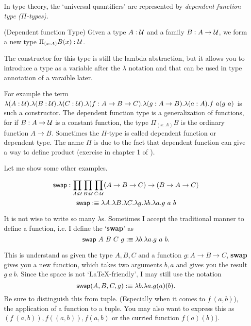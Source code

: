 In type theory, the `universal quantifiers' are represented by {\it
dependent function type ($\Pi$-types)}.

\begin{definition}
    \label{dependent-function}
    (Dependent function Type) Given a type $A:\mathcal{U}$ and a family 
    $B:A\to\mathcal{U}$, we form a new type $\Pi_{(x:A)}B(x): \mathcal{U}$.

    The constructor for this type is still the lambda abstraction,
    but it allows you to introduce a type as a variable after the $\lambda$
    notation and that can be used in type annotation of a varaible later.

\end{definition}

For example the term $\lambda (A:\mathcal{U}).\lambda (B:\mathcal{U}).\lambda (C:\mathcal{U}).\lambda (f: A\to B\to C).
\lambda (g: A\to B).\lambda (a: A). f\ a (g\ a)$ is such a constructor.
The dependent function type is a generalization of functions, for if
$B:A\to\mathcal{U}$ is a constant function, the type $\Pi_{(x:A)}B$ is
the ordinary function $A\to B$. Sometimes the $\Pi$-type is called 
dependent function or dependent type. The name $\Pi$ is due to the fact
that dependent function can give a way to define product (exercise in
chapter 1 of \cite{homotopy-type-theory}).

Let me show some other examples.

\newcommand{\swap}{\name{swap}}

$$
    \swap: \prod_{A:\universe}\prod_{B:\universe}\prod_{C:\universe}
    (A\to B\to C)\to (B\to A\to C)
$$
$$
    \swap \defn \lambda A.\lambda B.\lambda C.\lambda g.
    \lambda b.\lambda a. g\ a\ b
$$

It is not wise to write so many $\lambda$s. Sometimes I accept the
traditional manner to define a function, i.e. I define the `{\bf swap}' as
$$
    \swap\ A\ B\ C\ g \defn \lambda b.\lambda a.g\ a\ b.
$$

This is understand as given the type $A,B,C$ and a function $g:A\to B\to C$,
{\bf swap} gives you a new function, which takes two arguments $b,a$ and gives
you the result $g\ a\ b$. Since the space is not `\LaTeX-friendly', I may still
use the notation 
$$
\swap(A,B,C,g)\defn \lambda b.\lambda a.g(a)(b).
$$
Be sure to distinguish this from tuple. (Especially when it comes to $f\ (a, b)$),
the application of a function to a tuple. You may also want to express this
as $(f\ (a, b)),f((a,b)),f(a,b)$ or the curried function $f(a)(b)$).

